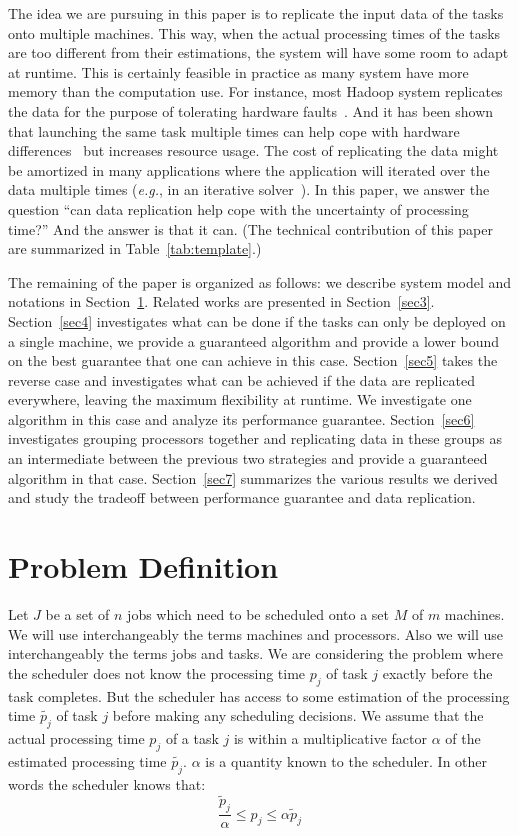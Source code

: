 \documentclass[10pt, conference, compsocconf]{IEEEtran}
\begin{document}
The idea we are pursuing in this paper is to replicate the input data
of the tasks onto multiple machines. This way, when the actual
processing times of the tasks are too different from their
estimations, the system will have some room to adapt at runtime. This
is certainly feasible in practice as many system have more memory than
the computation use. For instance, most Hadoop system replicates the
data for the purpose of tolerating hardware
faults~\cite{White:2009:HDG:1717298}. And it has been shown that
launching the same task multiple times can help cope with hardware
differences~\cite{DBLP:journals/corr/WangJW14} but increases resource
usage. The cost of replicating the data might be amortized in many
applications where the application will iterated over the data
multiple times ({\em e.g.}, in an iterative solver~\cite{Zhou12-P2S2,Zhou12-Cluster}). In this paper, we
answer the question ``can data replication help cope with the
uncertainty of processing time?''  And the answer is that it can. (The technical contribution of this paper are summarized in Table~\ref{tab:template}.)

The remaining of the paper is organized as follows: we describe system
model and notations in Section~\ref{sec2}. Related works are presented
in Section~\ref{sec3}.  Section~\ref{sec4} investigates what can be
done if the tasks can only be deployed on a single machine, we
provide a guaranteed algorithm and provide a lower bound on the best
guarantee that one can achieve in this case. Section~\ref{sec5} takes
the reverse case and investigates what can be achieved if the data are
replicated everywhere, leaving the maximum flexibility at runtime. We
investigate one algorithm in this case and analyze its performance
guarantee. Section~\ref{sec6} investigates grouping processors
together and replicating data in these groups as an intermediate
between the previous two strategies and provide a guaranteed algorithm
in that case. Section~\ref{sec7} summarizes the various results we
derived and study the tradeoff between performance guarantee and data
replication.

\section{Problem Definition}\label{sec2}
Let $J$ be a set of $n$ jobs which need to be scheduled onto a set $M$
of $m$ machines. We will use interchangeably the terms machines and
processors. Also we will use interchangeably the terms jobs and
tasks. We are considering the problem where the scheduler does not
know the processing time $p_j$ of task $j$ exactly before the task
completes.  But the scheduler has access to some estimation of the
processing time $\tilde{p_j}$ of task $j$ before making any scheduling
decisions. We assume that the actual processing time $p_j$ of a task
$j$ is within a multiplicative factor $\alpha$ of the estimated
processing time $\tilde{p_j}$. $\alpha$ is a quantity known to the
scheduler. In other words the scheduler knows that:
 \begin{equation}\label{eq1}
\frac{\tilde{p}_{j}}{\alpha}\leq p_{j}\leq \alpha \tilde{p}_{j}
\end{equation}
\end{document}
